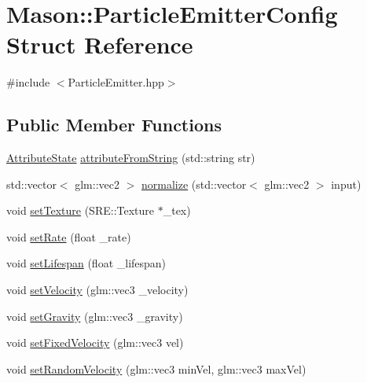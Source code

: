 \hypertarget{struct_mason_1_1_particle_emitter_config}{}\section{Mason\+:\+:Particle\+Emitter\+Config Struct Reference}
\label{struct_mason_1_1_particle_emitter_config}


{\ttfamily \#include $<$Particle\+Emitter.\+hpp$>$}

\subsection*{Public Member Functions}
\begin{DoxyCompactItemize}
\item 
\hyperlink{namespace_mason_aefc2ce7d9295b57af46ab6c8ebfc32f7}{Attribute\+State} \hyperlink{struct_mason_1_1_particle_emitter_config_a9ee7a40d6337225cccab9f801e8f793f}{attribute\+From\+String} (std\+::string str)
\item 
std\+::vector$<$ glm\+::vec2 $>$ \hyperlink{struct_mason_1_1_particle_emitter_config_ae3781dff36d32c1fb79a8ff63baf2c55}{normalize} (std\+::vector$<$ glm\+::vec2 $>$ input)
\item 
void \hyperlink{struct_mason_1_1_particle_emitter_config_a92978f0e01ba1078889a3f288ff0c02b}{set\+Texture} (S\+R\+E\+::\+Texture $\ast$\+\_\+tex)
\item 
void \hyperlink{struct_mason_1_1_particle_emitter_config_a8569c3e45131fd9d51687bbf293e3154}{set\+Rate} (float \+\_\+rate)
\item 
void \hyperlink{struct_mason_1_1_particle_emitter_config_afe91ca5c2d60e5567fe589367b4fd3ef}{set\+Lifespan} (float \+\_\+lifespan)
\item 
void \hyperlink{struct_mason_1_1_particle_emitter_config_ae5eafd4808934831fb271304c24b6af7}{set\+Velocity} (glm\+::vec3 \+\_\+velocity)
\item 
void \hyperlink{struct_mason_1_1_particle_emitter_config_ab34a3cc0d4c7252492a261c063b9376b}{set\+Gravity} (glm\+::vec3 \+\_\+gravity)
\item 
void \hyperlink{struct_mason_1_1_particle_emitter_config_a63a5b2c01c1f4cc0eaa1e8d4b9226146}{set\+Fixed\+Velocity} (glm\+::vec3 vel)
\item 
void \hyperlink{struct_mason_1_1_particle_emitter_config_a9102ce5287cd4c13e89f5e695563076f}{set\+Random\+Velocity} (glm\+::vec3 min\+Vel, glm\+::vec3 max\+Vel)
\item 

\end{DoxyCompactItemize}
